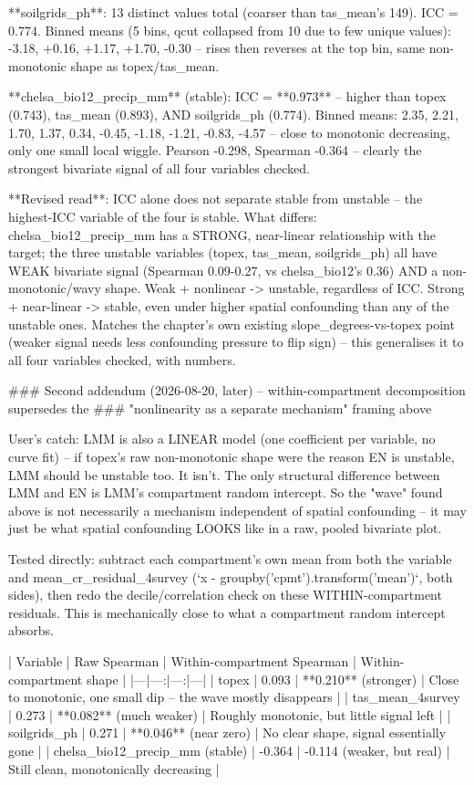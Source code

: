 **soilgrids_ph**: 13 distinct values total (coarser than tas_mean's 149). ICC = 0.774. Binned
means (5 bins, qcut collapsed from 10 due to few unique values): -3.18, +0.16, +1.17, +1.70,
-0.30 -- rises then reverses at the top bin, same non-monotonic shape as topex/tas_mean.

**chelsa_bio12_precip_mm** (stable): ICC = **0.973** -- higher than topex (0.743), tas_mean
(0.893), AND soilgrids_ph (0.774). Binned means: 2.35, 2.21, 1.70, 1.37, 0.34, -0.45, -1.18,
-1.21, -0.83, -4.57 -- close to monotonic decreasing, only one small local wiggle. Pearson
-0.298, Spearman -0.364 -- clearly the strongest bivariate signal of all four variables checked.

**Revised read**: ICC alone does not separate stable from unstable -- the highest-ICC variable of
the four is stable. What differs: chelsa_bio12_precip_mm has a STRONG, near-linear relationship
with the target; the three unstable variables (topex, tas_mean, soilgrids_ph) all have WEAK
bivariate signal (Spearman 0.09-0.27, vs chelsa_bio12's 0.36) AND a non-monotonic/wavy shape.
Weak + nonlinear -> unstable, regardless of ICC. Strong + near-linear -> stable, even under
higher spatial confounding than any of the unstable ones. Matches the chapter's own existing
slope_degrees-vs-topex point (weaker signal needs less confounding pressure to flip sign) --
this generalises it to all four variables checked, with numbers.

### Second addendum (2026-08-20, later) -- within-compartment decomposition supersedes the
### "nonlinearity as a separate mechanism" framing above

User's catch: LMM is also a LINEAR model (one coefficient per variable, no curve fit) -- if
topex's raw non-monotonic shape were the reason EN is unstable, LMM should be unstable too. It
isn't. The only structural difference between LMM and EN is LMM's compartment random intercept.
So the "wave" found above is not necessarily a mechanism independent of spatial confounding --
it may just be what spatial confounding LOOKS like in a raw, pooled bivariate plot.

Tested directly: subtract each compartment's own mean from both the variable and
mean_cr_residual_4survey (`x - groupby('cpmt').transform('mean')`, both sides), then redo the
decile/correlation check on these WITHIN-compartment residuals. This is mechanically close to
what a compartment random intercept absorbs.

| Variable | Raw Spearman | Within-compartment Spearman | Within-compartment shape |
|---|---:|---:|---|
| topex | 0.093 | **0.210** (stronger) | Close to monotonic, one small dip -- the wave mostly disappears |
| tas_mean_4survey | 0.273 | **0.082** (much weaker) | Roughly monotonic, but little signal left |
| soilgrids_ph | 0.271 | **0.046** (near zero) | No clear shape, signal essentially gone |
| chelsa_bio12_precip_mm (stable) | -0.364 | -0.114 (weaker, but real) | Still clean, monotonically decreasing |

